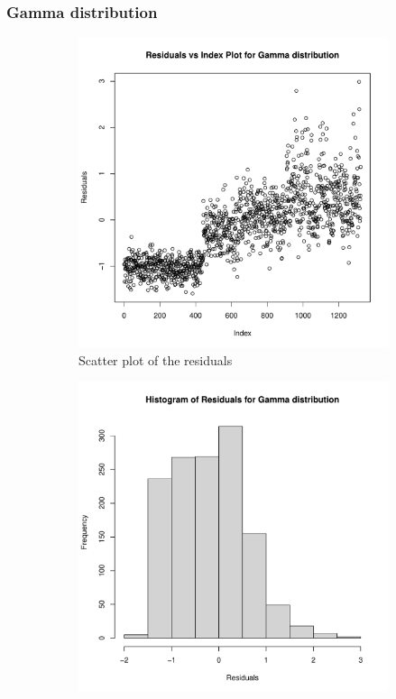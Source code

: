 \documentclass[12pt,a4paper,twoside]{article}
\begin{document}
\subsubsection{Gamma distribution}
\label{sssec:gamma}
\begin{figure}[!ht]
    \begin{subfigure}{.45\textwidth}
        \centering
        \includegraphics[width=\linewidth]{img/gamma_residuals.pdf}
        \caption{Scatter plot of the residuals}
        \label{fig:gammascatter}
    \end{subfigure}
    \begin{subfigure}{.45\textwidth}
        \centering
        \includegraphics[width=\linewidth]{img/gamma_residuals_hist.pdf}

\end{subfigure}
\end{figure}
\end{document}

